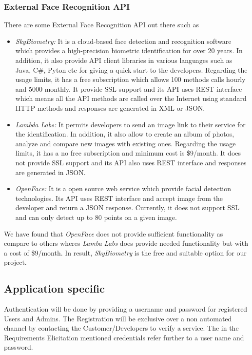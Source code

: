 \documentclass[a4paper,11pt]{article}
\begin{document}
\subsubsection{External Face Recognition API}
%
There are some External Face Recognition API out there such as
\begin{itemize}
\item \emph{SkyBiometry: } It is a cloud-based face detection and recognition software which provides a high-precision biometric identification for over 20 years. In addition, it also provide API client libraries in various languages such as Java, C\#, Pyton etc for giving a quick start to the developers. Regarding the usage limits, it has a free subscription which allows 100 methods calls hourly and 5000 monthly. It provide SSL support and its API uses REST interface which means all the API methods are called over the Internet using standard HTTP methods and responses are generated in XML or JSON.
\item \emph{Lambda Labs: } It permits developers to send an image link to their service for the identification. In addition, it also allow to create an album of photos, analyze and compare new images with existing ones. Regarding the usage limits, it has a no free subscription and minimum cost is \$9/month. It does not provide SSL support and its API also uses REST interface and responses are generated in JSON.
\item \emph{OpenFace: } It is a open source web service which provide facial detection technologies. Its API uses REST interface and accept image from the developer and return a JSON response. Currently, it does not support SSL and can only detect up to 80 points on a given image.
\end{itemize}
We have found that \emph{OpenFace} does not provide sufficient functionality as compare to others wheres \emph{Lamba Labs} does provide needed functionality but with a cost of \$9/month. In result, \emph{SkyBiometry} is the free and suitable option for our project.




\subsection{Application specific}
Authentication will be done by providing a username and password for registered Users and Admins. The Registration will be exclusive over  a non automated channel by contacting the Customer/Developers to verify a service. The in the Requirements Elicitation mentioned credentials refer further to a user name and password.
\end{document}
